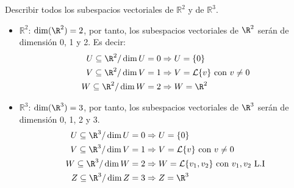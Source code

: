 \begin{ejercicio} Describir todos los subespacios vectoriales de \( \mathbb{R}^2 \) y de \( \mathbb{R}^3 \).
	\begin{itemize}
		\item \( \mathbb{R}^2 \): $\dim(\R^2)=2$, por tanto, los subespacios vectoriales de $\R^2$ serán de dimensión 0, 1 y 2. Es decir:
		      \begin{align*}
			      U \subseteq \R^2 / \dim{U} = 0 & \Rightarrow U = \{0\}                                  \\
			      V \subseteq \R^2 / \dim{V} = 1 & \Rightarrow V = \mathcal{L}\{v\} \text{ con } v \neq 0 \\
			      W \subseteq \R^2 / \dim{W} = 2 & \Rightarrow W = \R^2
		      \end{align*}
		\item \( \mathbb{R}^3 \): $\dim(\R^3)=3$, por tanto, los subespacios vectoriales de $\R^3$ serán de dimensión 0, 1, 2 y 3.
		      \begin{align*}
			      U \subseteq \R^3 / \dim{U} = 0 & \Rightarrow U = \{0\}                                                   \\
			      V \subseteq \R^3 / \dim{V} = 1 & \Rightarrow V = \mathcal{L}\{v\} \text{ con } v \neq 0                  \\
			      W \subseteq \R^3 / \dim{W} = 2 & \Rightarrow W = \mathcal{L}\{v_1,v_2\} \text{ con } v_1,v_2 \text{ L.I} \\
			      Z \subseteq \R^3 / \dim{Z} = 3 & \Rightarrow Z = \R^3
		      \end{align*}
	\end{itemize}
\end{ejercicio}



